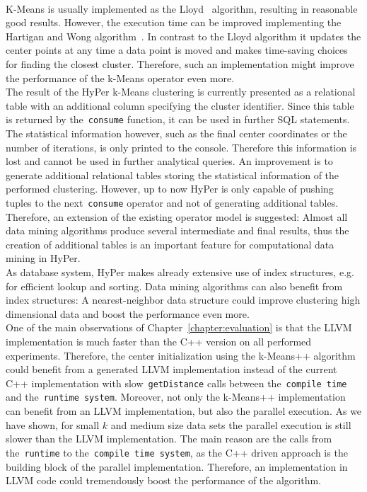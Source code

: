 \\
K-Means is usually implemented as the Lloyd~\parencite{Lloyd82} algorithm, resulting in reasonable good results. However, the execution time can be improved implementing the Hartigan and Wong algorithm~\parencite{hartigan1979algorithm}. In contrast to the Lloyd algorithm it updates the center points at any time a data point is moved and makes time-saving choices for finding the closest cluster. Therefore, such an implementation might improve the performance of the k-Means operator even more.
\\
The result of the HyPer k-Means clustering is currently presented as a relational table with an additional column specifying the cluster identifier. Since this table is returned by the~\texttt{consume} function, it can be used in further SQL statements. The statistical information however, such as the final center coordinates or the number of iterations, is only printed to the console. Therefore this information is lost and cannot be used in further analytical queries. An improvement is to generate additional relational tables storing the statistical information of the performed clustering. However, up to now HyPer is only capable of pushing tuples to the next~\texttt{consume} operator and not of generating additional tables. Therefore, an extension of the existing operator model is suggested: Almost all data mining algorithms produce several intermediate and final results, thus the creation of additional tables is an important feature for computational data mining in HyPer.
\\
As database system, HyPer makes already extensive use of index structures, e.g. for efficient lookup and sorting. Data mining algorithms can also benefit from index structures: A nearest-neighbor data structure could improve clustering high dimensional data and boost the performance even more.
\\
One of the main observations of Chapter~\ref{chapter:evaluation} is that the LLVM implementation is much faster than the C++ version on all performed experiments. Therefore, the center initialization using the k-Means++ algorithm could benefit from a generated LLVM implementation instead of the current C++ implementation with slow~\texttt{getDistance} calls between the~\texttt{compile time} and the~\texttt{runtime system}. Moreover, not only the k-Means++ implementation can benefit from an LLVM implementation, but also the parallel execution. As we have shown, for small $k$ and medium size data sets the parallel execution is still slower than the LLVM implementation. The main reason are the calls from the~\texttt{runtime} to the~\texttt{compile time system}, as the C++ driven approach is the building block of the parallel implementation. Therefore, an implementation in LLVM code could tremendously boost the performance of the algorithm. 
